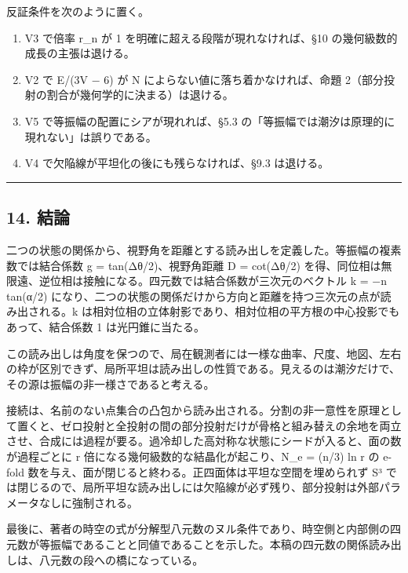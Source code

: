 \documentclass[
  a4paper,
]{ltjsarticle}
\providecommand{\tightlist}{%
  \setlength{\itemsep}{0pt}\setlength{\parskip}{0pt}}
\begin{document}
反証条件を次のように置く。

\begin{enumerate}
\def\labelenumi{\arabic{enumi}.}
\tightlist
\item
  V3 で倍率 r\_n が 1 を明確に超える段階が現れなければ、§10
  の幾何級数的成長の主張は退ける。
\item
  V2 で E/(3V − 6) が N によらない値に落ち着かなければ、命題
  2（部分投射の割合が幾何学的に決まる）は退ける。
\item
  V5 で等振幅の配置にシアが現れれば、§5.3
  の「等振幅では潮汐は原理的に現れない」は誤りである。
\item
  V4 で欠陥線が平坦化の後にも残らなければ、§9.3 は退ける。
\end{enumerate}

\begin{center}\rule{0.5\linewidth}{0.5pt}\end{center}

\subsection{14. 結論}\label{ux7d50ux8ad6}

二つの状態の関係から、視野角を距離とする読み出しを定義した。等振幅の複素数では結合係数
g = tan(Δθ/2)、視野角距離 D = cot(Δθ/2)
を得、同位相は無限遠、逆位相は接触になる。四元数では結合係数が三次元のベクトル
k = −n tan(α/2)
になり、二つの状態の関係だけから方向と距離を持つ三次元の点が読み出される。k
は相対位相の立体射影であり、相対位相の平方根の中心投影でもあって、結合係数
1 は光円錐に当たる。

この読み出しは角度を保つので、局在観測者には一様な曲率、尺度、地図、左右の枠が区別できず、局所平坦は読み出しの性質である。見えるのは潮汐だけで、その源は振幅の非一様さであると考える。

接続は、名前のない点集合の凸包から読み出される。分割の非一意性を原理として置くと、ゼロ投射と全投射の間の部分投射だけが骨格と組み替えの余地を両立させ、合成には過程が要る。過冷却した高対称な状態にシードが入ると、面の数が過程ごとに
r 倍になる幾何級数的な結晶化が起こり、N\_e = (n/3) ln r の e-fold
数を与え、面が閉じると終わる。正四面体は平坦な空間を埋められず S³
では閉じるので、局所平坦な読み出しには欠陥線が必ず残り、部分投射は外部パラメータなしに強制される。

最後に、著者の時空の式が分解型八元数のヌル条件であり、時空側と内部側の四元数が等振幅であることと同値であることを示した。本稿の四元数の関係読み出しは、八元数の段への橋になっている。
\end{document}

